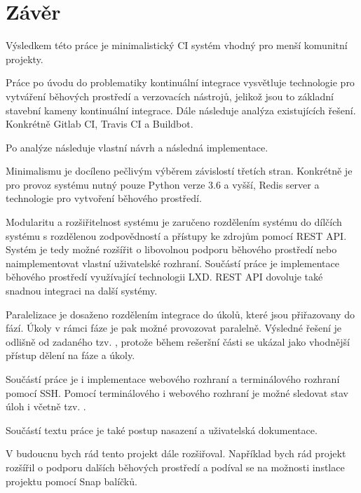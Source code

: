 \chapter{Závěr}

Výsledkem této práce je minimalistický CI systém vhodný pro menší komunitní projekty.

Práce po úvodu do problematiky kontinuální integrace vysvětluje technologie pro vytváření běhových prostředí a verzovacích nástrojů, jelikož jsou to základní stavební kameny kontinuální integrace.
Dále následuje analýza existujících řešení.
Konkrétně Gitlab CI, Travis CI a Buildbot.

Po analýze následuje vlastní návrh a následná implementace.

Minimalismu je docíleno pečlivým výběrem závislostí třetích stran.
Konkrétně je pro provoz systému nutný pouze Python verze 3.6 a vyšší, Redis server a technologie pro vytvoření běhového prostředí.

Modularitu a rozšiřitelnost systému je zaručeno rozdělením systému do dílčích systému s rozdělenou zodpovědností a přístupy ke zdrojům pomocí REST API.
Systém je tedy možné rozšířit o libovolnou podporu běhového prostředí nebo naimplementovat vlastní uživatelské rozhraní.
Součástí práce je implementace běhového prostředí využívající technologii LXD.
REST API dovoluje také snadnou integraci na další systémy.

Paralelizace je dosaženo rozdělením integrace do úkolů, které jsou přiřazovany do fází.
Úkoly v rámci fáze je pak možné provozovat paralelně.
Výsledné řešení je odlišně od zadaného tzv. , protože během rešeršní části se ukázal jako vhodnější přístup dělení na fáze a úkoly.

Součástí práce je i implementace webového rozhraní a terminálového rozhraní pomocí SSH.
Pomocí terminálového i webového rozhraní je možné sledovat stav úloh i včetně tzv. .

Součástí textu práce je také postup nasazení a uživatelská dokumentace.

V budoucnu bych rád tento projekt dále rozšiřoval.
Například bych rád projekt rozšířil o podporu dalších běhových prostředí a podíval se na možnosti instlace projektu pomocí Snap balíčků.



